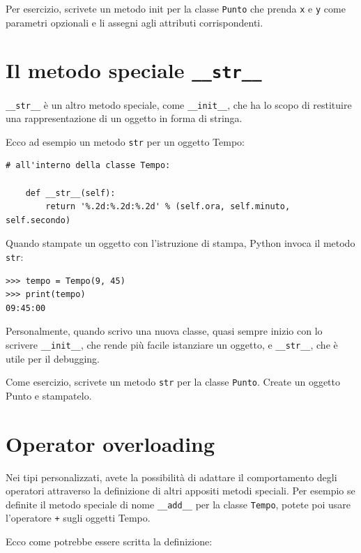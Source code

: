 \documentclass[10pt]{book}
\begin{document}
Per esercizio, scrivete un metodo init per la classe {\tt Punto} che prenda {\tt x} e {\tt y} come parametri opzionali e li assegni agli attributi corrispondenti.

\section{Il metodo speciale {\tt \_\_str\_\_}}

\verb"__str__" è un altro metodo speciale, come \verb"__init__",
che ha lo scopo di restituire una rappresentazione di un oggetto in forma di stringa.

Ecco ad esempio un metodo {\tt str} per un oggetto Tempo:

\begin{verbatim}
# all'interno della classe Tempo:

    def __str__(self):
        return '%.2d:%.2d:%.2d' % (self.ora, self.minuto, self.secondo)
\end{verbatim}
%
Quando stampate un oggetto con l'istruzione di stampa, Python invoca il metodo {\tt str}:

\begin{verbatim}
>>> tempo = Tempo(9, 45)
>>> print(tempo)
09:45:00
\end{verbatim}
%
Personalmente, quando scrivo una nuova classe, quasi sempre inizio con lo scrivere \verb"__init__", che rende più facile istanziare un oggetto, e 
\verb"__str__", che è utile per il debugging.

Come esercizio, scrivete un metodo {\tt str} per la classe {\tt Punto}.  Create un oggetto Punto e stampatelo.


\section{Operator overloading}
\label{operator.overloading}

Nei tipi personalizzati, avete la possibilità di adattare il comportamento degli operatori attraverso la definizione di altri appositi metodi speciali. Per esempio se definite il metodo speciale di nome \verb"__add__" per la classe {\tt Tempo}, potete poi usare l'operatore {\tt +} sugli oggetti Tempo.

Ecco come potrebbe essere scritta la definizione:
\end{document}
